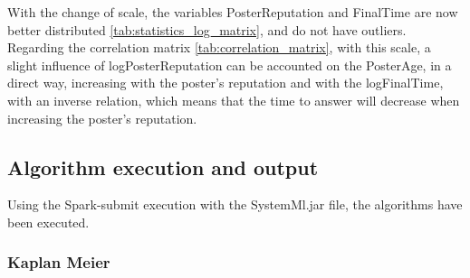 \documentclass[11pt]{book} %
\begin{document}
      \begin{table}[!ht]
        \centering
        \caption{Correlation matrix}
        \label{tab:correlation_matrix}
      \end{table}

      With the change of scale, the variables PosterReputation and FinalTime are now better distributed \ref{tab:statistics_log_matrix}, and do not have outliers. Regarding the correlation matrix \ref{tab:correlation_matrix}, with this scale, a slight influence of logPosterReputation can be accounted on the PosterAge, in a direct way, increasing with the poster's reputation and with the logFinalTime, with an inverse relation, which means that the time to answer will decrease when increasing the poster's reputation.

    \subsection{Algorithm execution and output}

      Using the Spark-submit execution with the SystemMl.jar file, the algorithms have been executed.

      \subsubsection{Kaplan Meier}
\end{document}
